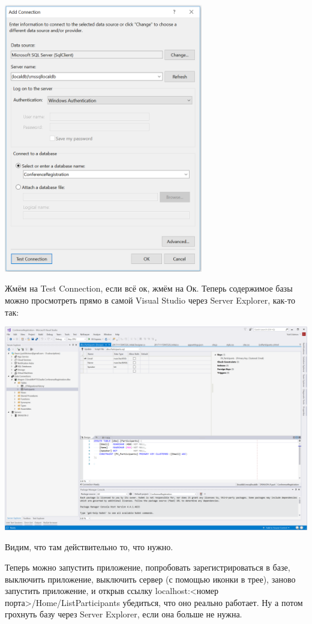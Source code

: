\documentclass[a5paper]{article}
\begin{document}
\begin{center}
	\includegraphics[width=0.65\textwidth]{addConnection.png}
\end{center}

Жмём на Test Connection, если всё ок, жмём на Ок. Теперь содержимое базы можно просмотреть прямо в самой Visual Studio через Server Explorer, как-то так:

\begin{center}
	\includegraphics[width=\textwidth]{databaseView.png}
\end{center}

Видим, что там действительно то, что нужно.

Теперь можно запустить приложение, попробовать зарегистрироваться в базе, выключить приложение, выключить сервер (с помощью иконки в трее), заново запустить приложение, и открыв ссылку localhost:<номер порта>/Home/ListParticipants убедиться, что оно реально работает.
Ну а потом грохнуть базу через Server Explorer, если она больше не нужна.
\end{document}
